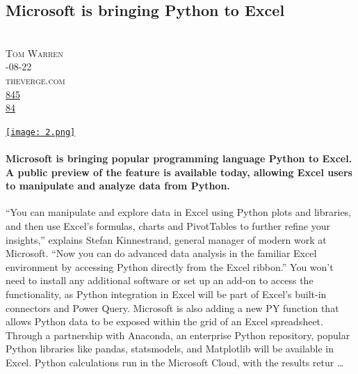 \documentclass[10pt,a4paper]{article}
\begin{document}
\subsection{Microsoft is bringing Python to Excel}
\noindent\begin{minipage}[t]{0.19\linewidth}
\vspace{0pt}
\noindent\scshape\footnotesize
\\ {\scriptsize\faUser}\space 
Tom Warren
\\ {\scriptsize\faCalendar}-08-22
\\ {\scriptsize\faGlobe}\space 
theverge.com
\\ {\scriptsize\faThumbsOUp}\space 
\href{http://news.ycombinator.com/item?id=37222191\&utm\_term=comment}{845} 
\\ {\scriptsize\faComments}\space 
\href{http://news.ycombinator.com/item?id=37222191\&utm\_term=comment}{84} 
\end{minipage} 
\begin{minipage}[t]{0.80\linewidth}
\vspace{0pt}
\begin{multicols}{2}
    \href{https://www.theverge.com/2023/8/22/23841167/microsoft-excel-python-integration-support?utm\_source=hackernewsletter\&utm\_medium=email\&utm\_term=fav}{
        \texttt{[image: 2.png]}
    }
\paragraph{Microsoft is bringing popular programming language Python to Excel. A public preview of the feature is available today, allowing Excel users to manipulate and analyze data from Python.}

“You can manipulate and explore data in Excel using Python plots and libraries, and then use Excel’s formulas, charts and PivotTables to further refine your insights,” explains Stefan Kinnestrand, general manager of modern work at Microsoft. “Now you can do advanced data analysis in the familiar Excel environment by accessing Python directly from the Excel ribbon.”
You won’t need to install any additional software or set up an add-on to access the functionality, as Python integration in Excel will be part of Excel’s built-in connectors and Power Query. Microsoft is also adding a new PY function that allows Python data to be exposed within the grid of an Excel spreadsheet. Through a partnership with Anaconda, an enterprise Python repository, popular Python libraries like pandas, statsmodels, and Matplotlib will be available in Excel.
Python calculations run in the Microsoft Cloud, with the results retur
\dots
\end{multicols}
\end{minipage}
\par\medskip
\end{document}
